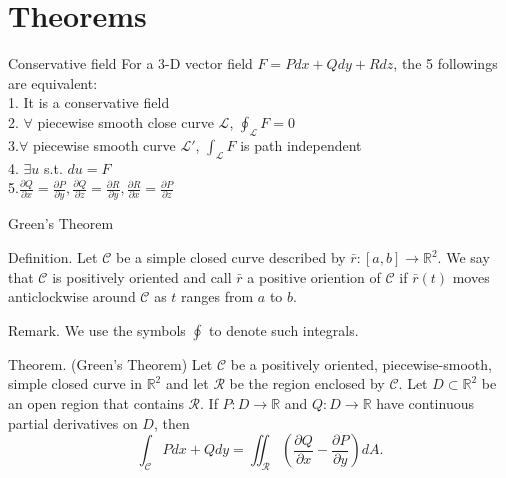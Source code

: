 \documentclass{beamer}
\begin{document}
\section{Theorems}
    \begin{frame}{Conservative field}
        For a 3-D vector field $F=Pdx+Qdy+Rdz$, the 5 followings are equivalent:\\
        1. It is a conservative field\\
        2. $\forall$ piecewise smooth close curve $\mathcal{L}$, $\oint_{\mathcal{L}}F=0 $\\
        3.$\forall$ piecewise smooth curve $\mathcal{L'}$, $\int_{\mathcal{L}}F$ is path independent\\
        4. $\exists u$ s.t. $du=F$\\
        5.$\frac{\partial Q}{\partial x}=\frac{\partial P}{\partial y}, \frac{\partial Q}{\partial z}=\frac{\partial R}{\partial y}, \frac{\partial R}{\partial x}=\frac{\partial P}{\partial z}$
    \end{frame}
    \begin{frame}[t]{Green's Theorem}
        \begin{block}{}
            \par \textcolor{yy}{Definition.} Let $\mathcal{C}$ be a simple closed curve described by $\bar{r}: [a,b] \to \mathbb{R}^2$. We say that $\mathcal{C}$ is \textcolor{yy}{positively oriented} and call $\bar{r}$ a \textcolor{yy}{positive oriention of $\mathcal{C}$} if $\bar{r}(t)$ moves anticlockwise around $\mathcal{C}$ as $t$ ranges from $a$ to $b$.
        \end{block}

        \phantom{yy}

        \par \textcolor{yy}{Remark.} We use the symbols $\displaystyle \oint$ to denote such integrals.

        \phantom{yy}

        \par \textcolor{yy}{Theorem. (Green's Theorem)} Let $\mathcal{C}$ be a positively oriented, piecewise-smooth, simple closed curve in $\mathbb{R}^2$ and let $\mathcal{R}$ be the region enclosed by $\mathcal{C}$. Let $D \subset \mathbb{R}^2$ be an open region that contains $\mathcal{R}$. If $P: D \to \mathbb{R}$ and $Q: D \to \mathbb{R}$ have continuous partial derivatives on $D$, then 
        \begin{equation*}
            \int_{\mathcal{C}} Pdx + Qdy = \iint_{\mathcal{R}} \left( \dfrac{\partial Q}{\partial x} - \dfrac{\partial P}{\partial y}\right) dA.
        \end{equation*}
    \end{frame}
\end{document}
